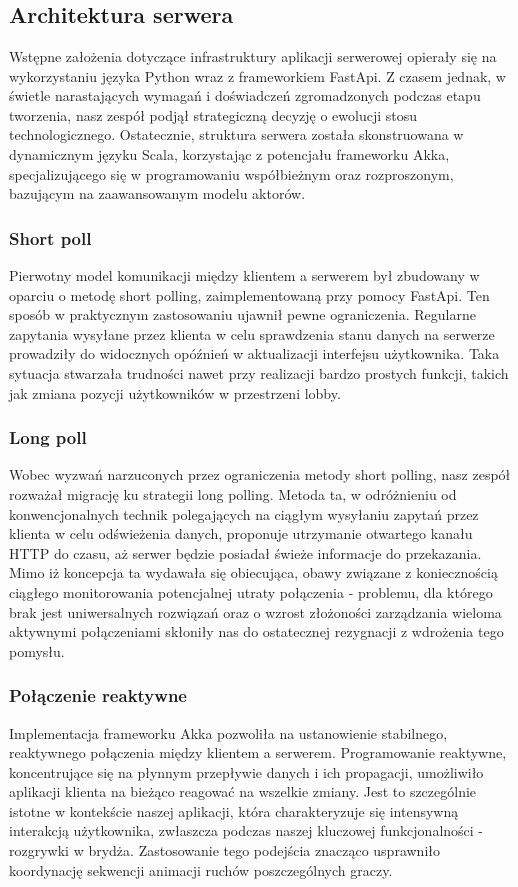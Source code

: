 \chapter{\ChapterTitleRealizationAspects}
\label{sec:wybrane-aspekty-realizacji}

\section{Architektura serwera}
Wstępne założenia dotyczące infrastruktury aplikacji serwerowej opierały się na wykorzystaniu języka Python wraz z frameworkiem FastApi. Z czasem jednak, w świetle narastających wymagań i doświadczeń zgromadzonych podczas etapu tworzenia, nasz zespół podjął strategiczną decyzję o ewolucji stosu technologicznego. Ostatecznie, struktura serwera została skonstruowana w dynamicznym języku Scala, korzystając z potencjału frameworku Akka, specjalizującego się w programowaniu współbieżnym oraz rozproszonym, bazującym na zaawansowanym modelu aktorów. 
\subsection{Short poll}
Pierwotny model komunikacji między klientem a serwerem był zbudowany w oparciu o metodę short polling, zaimplementowaną przy pomocy FastApi. Ten sposób w praktycznym zastosowaniu ujawnił pewne ograniczenia. Regularne zapytania wysyłane przez klienta w celu sprawdzenia stanu danych na serwerze prowadziły do widocznych opóźnień w aktualizacji interfejsu użytkownika. Taka sytuacja stwarzała trudności nawet przy realizacji bardzo prostych funkcji, takich jak zmiana pozycji użytkowników w przestrzeni lobby.
\subsection{Long poll}
Wobec wyzwań narzuconych przez ograniczenia metody short polling, nasz zespół rozważał migrację ku strategii long polling. Metoda ta, w odróżnieniu od konwencjonalnych technik polegających na ciągłym wysyłaniu zapytań przez klienta w celu odświeżenia danych, proponuje utrzymanie otwartego kanału HTTP do czasu, aż serwer będzie posiadał świeże informacje do przekazania. Mimo iż koncepcja ta wydawała się obiecująca, obawy związane z koniecznością ciągłego monitorowania potencjalnej utraty połączenia - problemu, dla którego brak jest uniwersalnych rozwiązań oraz o wzrost złożoności zarządzania wieloma aktywnymi połączeniami skłoniły nas do ostatecznej rezygnacji z wdrożenia tego pomysłu.
\subsection{Połączenie reaktywne}
Implementacja frameworku Akka pozwoliła na ustanowienie stabilnego, reaktywnego połączenia między klientem a serwerem. Programowanie reaktywne, koncentrujące się na płynnym przepływie danych i ich propagacji, umożliwiło aplikacji klienta na bieżąco reagować na wszelkie zmiany. Jest to szczególnie istotne w kontekście naszej aplikacji, która charakteryzuje się intensywną interakcją użytkownika, zwłaszcza podczas naszej kluczowej funkcjonalności - rozgrywki w brydża. Zastosowanie tego podejścia znacząco usprawniło koordynację sekwencji animacji ruchów poszczególnych graczy.
